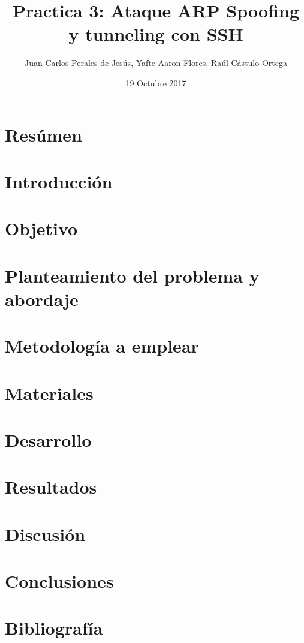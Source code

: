 \documentclass{report}
\title{Practica 3: Ataque ARP Spoofing y tunneling con SSH}
\author{Juan Carlos Perales de Jes\'us, Yafte Aaron Flores, Ra\'ul C\'astulo Ortega}
\date{19 Octubre 2017}
\begin{document}
\section{Res\'umen}

\section{Introducci\'on}

\section{Objetivo}

\section{Planteamiento del problema y abordaje}

\section{Metodolog\'ia a emplear}

\section{Materiales}

\section{Desarrollo}

\section{Resultados}

\section{Discusi\'on}

\section{Conclusiones}

\section{Bibliograf\'ia}
\end{document}
